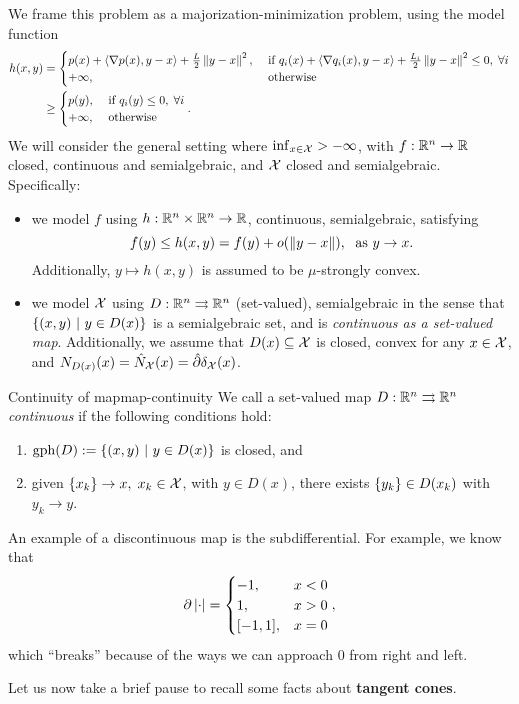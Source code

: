 We frame this problem as a majorization-minimization problem, using the model
function
\begin{align*}
	h(x, y) &= \begin{cases}
		p(x) + \left\langle \nabla p(x), y - x \right\rangle + \frac{L}{2} \left \| y - x \right \|^2, & \text{ if
		} q_i(x) + \left\langle \nabla q_i(x), y - x \right\rangle + \frac{L_i}{2} \left \| y - x \right \|^2
		\leq 0, \; \forall i \\
		+\infty, & \text{ otherwise}
	\end{cases} \\
		& \geq \begin{cases}
		p(y), & \text{ if } q_i(y) \leq 0, \; \forall i \\
		+\infty, & \text{ otherwise}
	\end{cases}.
\end{align*}
We will consider the general setting where $ \inf_{x \in \mathcal{X}} > -\infty$, with
$f: \mathbb{R}^n \to \mathbb{R}$ closed, continuous and semialgebraic, and $\mathcal{X}$ closed and
semialgebraic. Specifically:
\begin{itemize}
	\item we model $f$ using $h: \mathbb{R}^{n} \times \mathbb{R}^n \to \mathbb{R}$,
	continuous, semialgebraic, satisfying
	\[
		f(y) \leq h(x, y) = f(y) + o(\left \| y - x \right \|), \; \text{ as } y \to x.
	\]
	Additionally, $y \mapsto h(x, y)$ is assumed to be $\mu$-strongly convex.
	\item we model $\mathcal{X}$ using $D: \mathbb{R}^n \rightrightarrows \mathbb{R}^n$ (set-valued),
		semialgebraic in the sense that $\left\{ (x, y) \ \middle| \  y \in D(x) \right\}$ is a
		semialgebraic set, and is \textit{continuous as a set-valued map}.
		Additionally, we assume that $D(x) \subseteq \mathcal{X}$ is closed, convex for
		any $x \in \mathcal{X}$, and $N_{D(x)}(x) = \hat{N}_{\mathcal{X}}(x) = \hat{\partial}
		\delta_{\mathcal{X}}(x)$.
\end{itemize}

\begin{cdefinition}{Continuity of map}{map-continuity}
	We call a set-valued map $D: \mathbb{R}^n \rightrightarrows \mathbb{R}^n$ \textit{continuous} if
	the following conditions hold:
	\begin{enumerate}
		\item $\mathrm{gph}(D) := \left\{ (x, y) \ \middle| \  y \in D(x) \right\}$ is closed, and
		\item given $\left\{ x_k \right\} \to x, \; x_k \in \mathcal{X}$, with $y \in D(x)$, there
			exists $\left\{ y_k \right\} \in D(x_k)$ with $y_k \to y$.
	\end{enumerate}
\end{cdefinition}

An example of a discontinuous map is the subdifferential. For example, we know
that
\[
	\partial \left| \cdot \right| = \begin{cases}
		-1, & x < 0 \\
		1, & x > 0 \\
		[-1, 1], & x = 0
	\end{cases},
\]
which ``breaks'' because of the ways we can approach $0$ from right and left.

Let us now take a brief pause to recall some facts about \textbf{tangent
cones}.

